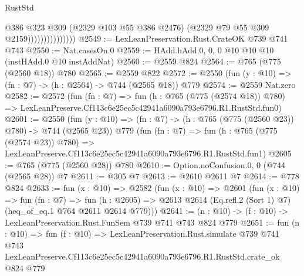 \begin{lexlean}{RustStd}
\begin{coremodule}
                                @386
                                @323
                                @309
                                (@2329 @103 @55 @386 @2476)
                                (@2329 @79 @55 @309 @2159)))))))))))))))
@2549 := LexLeanPreservation.Rust.CrateOK @739 @741 @743
@2550 := Nat.casesOn.{0}
@2559 := HAdd.hAdd.{0, 0, 0} @10 @10 @10 (instHAdd.{0} @10 instAddNat)
@2560 := @2559 @824
@2564 := @765 (@775 (@2560 @18)) @780
@2565 := @2559 @822
@2572 := @2550 (fun (y : @10) => (fn : @7) -> (h : @2564) -> @744 (@2565 @18)) @779
@2574 := @2559 Nat.zero
@2582 := @2572
    (fun (fn : @7) =>
    fun (h : @765 (@775 (@2574 @18)) @780) =>
    LexLeanPreserve.Cf113c6e25ec5c42941a6090a793e6796.R1.RustStd.fun0)
@2601 := @2550
    (fun (y : @10) => (fn : @7) -> (h : @765 (@775 (@2560 @23)) @780) -> @744 (@2565 @23))
    @779
    (fun (fn : @7) =>
    fun (h : @765 (@775 (@2574 @23)) @780) =>
    LexLeanPreserve.Cf113c6e25ec5c42941a6090a793e6796.R1.RustStd.fun1)
@2605 := @765 (@775 (@2560 @28)) @780
@2610 := Option.noConfusion.{0, 0} (@744 (@2565 @28)) @7
@2611 := @305 @7
@2613 := @2610 @2611 @7
@2614 := @778 @824
@2633 := fun (x : @10) =>
  @2582
    (fun (x : @10) =>
    @2601
      (fun (x : @10) =>
      fun (fn : @7) =>
      fun (h : @2605) =>
      @2613 @2614 (Eq.refl.{2} (Sort 1) @7) (heq_of_eq.{1} @764 @2611 @2614 @779)))
@2641 := (n : @10) -> (f : @10) -> LexLeanPreservation.Rust.FunSem @739 @741 @743 @824 @779
@2651 := fun (n : @10) =>
  fun (f : @10) =>
  LexLeanPreservation.Rust.simulate
    @739
    @741
    @743
    LexLeanPreserve.Cf113c6e25ec5c42941a6090a793e6796.R1.RustStd.crate_ok
    @824
    @779
\end{coremodule}
\end{lexlean}
